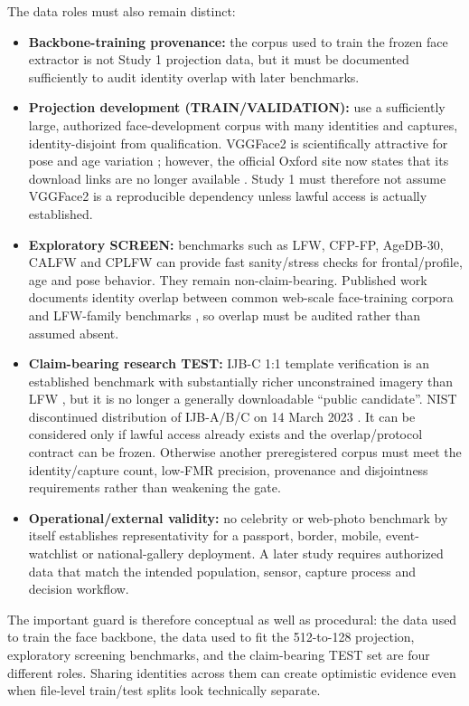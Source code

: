 \documentclass[10pt,a4paper]{article}
\begin{document}
The data roles must also remain distinct:
\begin{itemize}
\item \textbf{Backbone-training provenance:} the corpus used to train the frozen face
      extractor is not Study 1 projection data, but it must be documented sufficiently to
      audit identity overlap with later benchmarks.
\item \textbf{Projection development (TRAIN/VALIDATION):} use a sufficiently large,
      authorized face-development corpus with many identities and captures, identity-disjoint
      from qualification. VGGFace2 is scientifically attractive for pose and age variation
      \cite{vggface2_2018}; however, the official Oxford site now states that its download
      links are no longer available \cite{vggface2site}. Study 1 must therefore not assume
      VGGFace2 is a reproducible dependency unless lawful access is actually established.
\item \textbf{Exploratory SCREEN:} benchmarks such as LFW, CFP-FP, AgeDB-30, CALFW and CPLFW
      can provide fast sanity/stress checks for frontal/profile, age and pose behavior. They
      remain non-claim-bearing. Published work documents identity overlap between common
      web-scale face-training corpora and LFW-family benchmarks \cite{overlap2024}, so
      overlap must be audited rather than assumed absent.
\item \textbf{Claim-bearing research TEST:} IJB-C 1:1 template verification is an
      established benchmark with substantially richer unconstrained imagery than LFW
      \cite{ijbc2018}, but it is no longer a generally downloadable ``public candidate''.
      NIST discontinued distribution of IJB-A/B/C on 14 March 2023 \cite{nistijb}. It can be
      considered only if lawful access already exists and the overlap/protocol contract can
      be frozen. Otherwise another preregistered corpus must meet the identity/capture count,
      low-FMR precision, provenance and disjointness requirements rather than weakening the
      gate.
\item \textbf{Operational/external validity:} no celebrity or web-photo benchmark by itself
      establishes representativity for a passport, border, mobile, event-watchlist or
      national-gallery deployment. A later study requires authorized data that match the
      intended population, sensor, capture process and decision workflow.
\end{itemize}

The important guard is therefore conceptual as well as procedural: the data used to train
the face backbone, the data used to fit the 512-to-128 projection, exploratory screening
benchmarks, and the claim-bearing TEST set are four different roles. Sharing identities
across them can create optimistic evidence even when file-level train/test splits look
technically separate.
\end{document}
